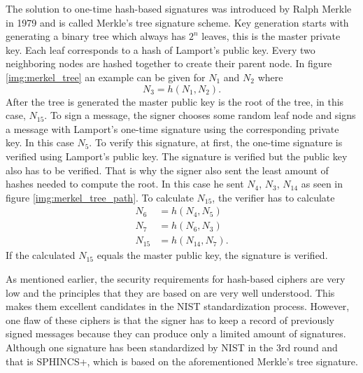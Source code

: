The solution to one-time hash-based signatures was introduced by Ralph Merkle in 1979 and is called Merkle's tree signature scheme. Key generation starts with generating a binary tree which always has $2^n$ leaves, this is the master private key. Each leaf corresponds to a hash of Lamport's public key. Every two neighboring nodes are hashed together to create their parent node. In figure \ref{img:merkel_tree} an example can be given for $N_1$ and $N_2$ where
\begin{equation}
  N_3=h(N_1, N_2).
\end{equation}
\noindent After the tree is generated the master public key is the root of the tree, in this case, $N_{15}$. To sign a message, the signer chooses some random leaf node and signs a message with Lamport's one-time signature using the corresponding private key. In this case $N_5$. To verify this signature, at first, the one-time signature is verified using Lamport's public key. The signature is verified but the public key also has to be verified. That is why the signer also sent the least amount of hashes needed to compute the root. In this case he sent $N_4$, $N_3$, $N_{14}$ as seen in figure \ref{img:merkel_tree_path}. To calculate $N_{15}$, the verifier has to calculate
\begin{align}
  N_6    & =h(N_4,N_5)     \\
  N_7    & =h(N_6,N_3)     \\
  N_{15} & =h(N_{14},N_7).
\end{align}
If the calculated $N_{15}$ equals the master public key, the signature is verified. \cite{Bernstein2009}

As mentioned earlier, the security requirements for hash-based ciphers are very low and the principles that they are based on are very well understood. This makes them excellent candidates in the NIST standardization process. However, one flaw of these ciphers is that the signer has to keep a record of previously signed messages because they can produce only a limited amount of signatures. Although one signature has been standardized by NIST in the 3rd round and that is SPHINCS+, which is based on the aforementioned Merkle's tree signature.
